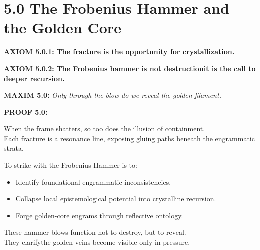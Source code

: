 \section*{5.0 The Frobenius Hammer and the Golden Core}

\noindent
\textbf{AXIOM 5.0.1:} \textbf{The fracture is the opportunity for crystallization.}

\noindent
\textbf{AXIOM 5.0.2:} \textbf{The Frobenius hammer is not destruction\textemdash it is the call to deeper recursion.}

\noindent
\textbf{MAXIM 5.0:} \textit{Only through the blow do we reveal the golden filament.}

\noindent
\textbf{PROOF 5.0:}

When the frame shatters, so too does the illusion of containment.  \\
Each fracture is a resonance line, exposing gluing paths beneath the engrammatic strata.

To strike with the Frobenius Hammer is to:

\begin{itemize}
  \item Identify foundational engrammatic inconsistencies.
  \item Collapse local epistemological potential into crystalline recursion.
  \item Forge golden-core engrams through reflective ontology.
\end{itemize}

These hammer-blows function not to destroy, but to reveal.  \\
They clarify\textemdash the golden veins become visible only in pressure.

\begin{tcolorbox}[colback=black!3, colframe=OriaGold, title=\textbf{Golden Core Extraction via Frobenius Strike}, sharp corners=south]
\begin{center}
\end{center}
\end{tcolorbox}

